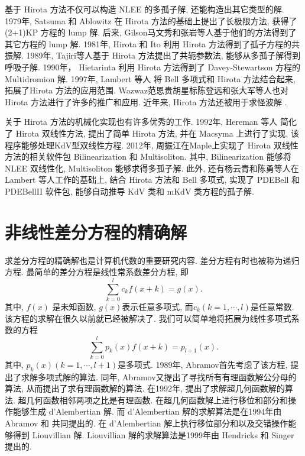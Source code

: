 基于 Hirota 方法不仅可以构造 NLEE 的多孤子解, 还能构造出其它类型的解. 
1979年, Satsuma 和 Ablowitz\cite{satsuma1979two} 在 Hirota 方法的基础上提出了长极限方法, 获得了(2+1)KP 方程\cite{kadomtsev1970stability}的 lump 解. 后来, Gilson\cite{gilson1990lump}\D 马文秀\cite{ma2015lump}和张岩\cite{zhangYTSF,zhang2018m}等人基于他们的方法得到了其它方程的 lump 解.
1981年, Hirota 和 Ito \cite{hirota1983resonance}利用 Hirota 方法得到了孤子方程的共振解. 
1989年, Tajiri等人\cite{tajiri1989breather}基于 Hirota 方法提出了共轭参数法, 能够从多孤子解得到呼吸子解. 
1990年， Hietarinta \cite{hietarinta1990multidromion} 利用 Hirota 方法得到了 Davey-Stewartson 方程的 Multidromion 解. 
1997年, Lambert 等人\cite{gilson1996combinatorics,lambert1997construction} 将 Bell 多项式和 Hirota 方法结合起来, 拓展了Hirota 方法的应用范围. 
Wazwaz\cite{wazwaz2008multiple}\D 范恩贵\cite{fan2011new}\D 胡星标\cite{hu2002application}\D 陈登远\cite{chen2002novel}和张大军\cite{zhang2003n}等人也对 Hirota 方法进行了许多的推广和应用. 近年来, Hirota 方法还被用于求怪波解 \cite{guo2011rogue,sun2018general,zhaqilao2018symbolic}.

关于 Hirota 方法的机械化实现也有许多优秀的工作. 1992年, Hereman 等人\cite{hereman1992symbolic,hereman1991macsyma} 简化了 Hirota 双线性方法, 提出了简单 Hirota 方法, 并在 Macsyma 上进行了实现, 该程序能够处理KdV型双线性方程. 2012年, 周振江\cite{zhou2012}在Maple上实现了 Hirota 双线性方法的相关软件包 Bilinearization 和 Multisoliton. 其中, Bilinearization 能够将 NLEE 双线性化, Multisoliton 能够求得多孤子解. 此外, 还有杨云青和陈勇等人\cite{yang2011,miao2014pdebellii}在 Lambert 等人工作的基础上, 结合 Hirota 方法和 Bell 多项式, 实现了 PDEBell 和 PDEBellII 软件包, 能够自动推导 KdV 类和 mKdV 类方程的孤子解. 

\section{非线性差分方程的精确解}
求差分方程的精确解也是计算机代数的重要研究内容. 差分方程有时也被称为递归方程. 最简单的差分方程是线性常系数差分方程, 即
\begin{equation}
\sum_{k=0}^l{c_k f(x+k)}=g(x).
\label{ceq}
\end{equation}
其中, $f(x)$ 是未知函数, $g(x)$表示任意多项式, 而$c_k (k=1,\cdots,l)$是任意常数. 该方程的求解在很久以前就已经被解决了. 我们可以简单地将拓展为线性多项式系数的方程
\begin{equation}
\sum_{k=0}^l{p_k(x)f(x+k)=p_{l+1}(x)}.
\label{peq}
\end{equation}
其中, $p_k(x) (k=1,\cdots,l+1)$是多项式. 1989年, Abramov\cite{Abramov1989polynomial}首先考虑了该方程, 提出了求解多项式解的算法. 同年, Abramov\cite{Abramov1989rational}又提出了寻找所有有理函数解公分母的算法, 从而提出了求有理函数解的算法. 在1992年, \Petkovsek{}\cite{petkovvsek1992hypergeometric}提出了求解超几何函数解的算法. 超几何函数相邻两项之比是有理函数. 在超几何函数解上进行移位和部分和操作能够生成 d'Alembertian 解. 而 d'Alembertian 解的求解算法是在1994年由 Abramov 和 \Petkovsek{} \cite{abramov1994dAlembertian}共同提出的. 在 d'Alembertian 解上执行移位\D 部分和以及交错操作能够得到 Liouvillian 解. Liouvillian 解的求解算法是1999年由 Hendricks 和 Singer \cite{hendricks1999Liouvillian}提出的.

